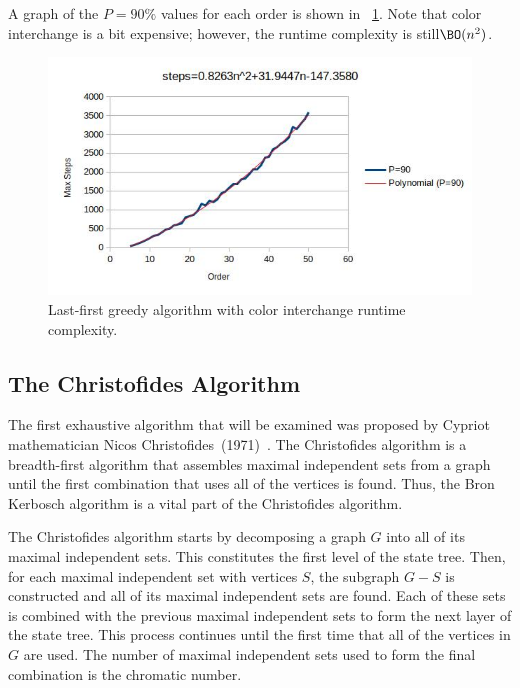 A graph of the \(P=90\%\) values for each order is shown in \figurename~\ref{fig:greedyint:runtime}.  Note that
color interchange is a bit expensive; however, the runtime complexity is still\(\BO(n^2)\).

\begin{figure}[H]
  \centering
  \includegraphics[width=5in]{greedyint_runtime}
  \caption{Last-first greedy algorithm with color interchange runtime complexity.}
  \label{fig:greedyint:runtime}
\end{figure}

\subsection{The Christofides Algorithm}\label{sec:sub:christofides}

The first exhaustive algorithm that will be examined was proposed by Cypriot mathematician Nicos
Christofides~(1971)~\cite{christofides}.  The Christofides algorithm is a breadth-first algorithm that assembles
maximal independent sets from a graph until the first combination that uses all of the vertices is found.  Thus,
the Bron Kerbosch algorithm is a vital part of the Christofides algorithm.

The Christofides algorithm starts by decomposing a graph \(G\) into all of its maximal independent sets.  This
constitutes the first level of the state tree.  Then, for each maximal independent set with vertices \(S\), the
subgraph \(G-S\) is constructed and all of its maximal independent sets are found.  Each of these sets is combined
with the previous maximal independent sets to form the next layer of the state tree.  This process continues until
the first time that all of the vertices in \(G\) are used.  The number of maximal independent sets used to form the
final combination is the chromatic number.

